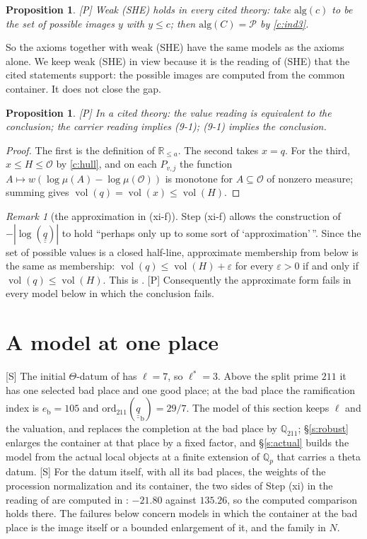 \documentclass[11pt]{article}
\theoremstyle{plain}
\newtheorem{proposition}[theorem]{Proposition}
\theoremstyle{definition}
\theoremstyle{remark}
\newtheorem{remark}[theorem]{Remark}
\newcommand{\Smark}{\textup{[S]}}
\newcommand{\Pmark}{\textup{[P]}}
\newcommand{\vol}{\operatorname{vol}}
\newcommand{\Poss}{\mathcal P}
\newcommand{\cO}{\mathcal O}
\newcommand{\Qp}[1]{\mathbb Q_{#1}}
\newcommand{\qbb}{\underline{\underline q}}
\begin{document}
\begin{proposition}\label{p:weak}
\Pmark{} Weak (SHE) holds in every cited theory: take $\mathrm{alg}(c)$ to be the set of
possible images $y$ with $y\le c$; then $\mathrm{alg}(C)=\Poss$ by \ref{c:ind3}.
\end{proposition}

So the axioms together with weak (SHE) have the same models as the axioms alone. We keep
weak (SHE) in view because it is the reading of (SHE) that the cited statements support:
the possible images are computed from the common container. It does not close the gap.

\begin{proposition}\label{p:strong}
\Pmark{} In a cited theory: the value reading is equivalent to the conclusion; the
carrier reading implies (9-1); (9-1) implies the conclusion.
\end{proposition}

\begin{proof}
The first is the definition of $\mathbb R_{\le a}$. The second takes $x=q$. For the third,
$x\le H\le\cO$ by \ref{c:hull}, and on each $P_{v,j}$ the function
$A\mapsto w(\log\mu(A)-\log\mu(\cO))$ is monotone for $A\subseteq\cO$ of nonzero
measure; summing gives $\vol(q)=\vol(x)\le\vol(H)$.
\end{proof}

\begin{remark}[the approximation in (xi-f)]\label{r:approx}
Step (xi-f) allows the construction of $-|\log(\qbb)|$ to hold ``perhaps only up to some
sort of `approximation'\,''. Since the set of possible values is a closed half-line,
approximate membership from below is the same as membership: $\vol(q)\le\vol(H)+\varepsilon$
for every $\varepsilon>0$ if and only if $\vol(q)\le\vol(H)$. This is
\cite[Lemma~4.1]{Higuchi}. \Pmark{} Consequently the approximate form fails in every model
below in which the conclusion fails.
\end{remark}

\section{A model at one place}\label{s:model}

\Smark{} The initial $\Theta$-datum of \cite[Thm.~1]{First} has $\ell=7$, so $\ell^*=3$.
Above the split prime $211$ it has one selected bad place and one good place; at the bad
place the ramification index is $e_{\mathrm b}=105$ and
$\mathrm{ord}_{211}(\qbb_{\mathrm b})=29/7$. The model of this section keeps $\ell$ and
the valuation, and replaces the completion at the bad place by $\Qp{211}$; \S\ref{s:robust}
enlarges the container at that place by a fixed factor, and \S\ref{s:actual} builds the
model from the actual local objects at a finite extension of $\Qp p$ that carries a theta
datum. \Smark{} For the datum itself, with all its bad places, the weights of the procession
normalization and its container, the two sides of Step (xi) in the reading of \cite{IUT4}
are computed in \cite[\S8.4]{TC}: $-21.80$ against $135.26$, so the computed comparison
holds there. The failures below concern models in which the container at the bad place is
the image itself or a bounded enlargement of it, and the family in $N$.
\end{document}
